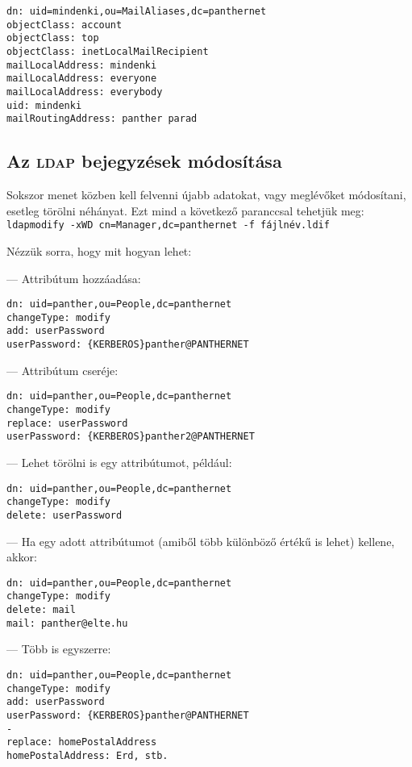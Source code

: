 \begin{Verbatim}[frame=single]
dn: uid=mindenki,ou=MailAliases,dc=panthernet
objectClass: account
objectClass: top
objectClass: inetLocalMailRecipient
mailLocalAddress: mindenki
mailLocalAddress: everyone
mailLocalAddress: everybody
uid: mindenki
mailRoutingAddress: panther parad
\end{Verbatim}


\subsection{Az \textsc{ldap} bejegyzések módosítása}

Sokszor menet közben kell felvenni újabb adatokat, vagy meglévőket módosítani, esetleg törölni néhányat. Ezt mind a
következő paranccsal tehetjük meg:\\
\texttt{ldapmodify -xWD cn=Manager,dc=panthernet -f fájlnév.ldif}

Nézzük sorra, hogy mit hogyan lehet:

\noindent  --- Attribútum hozzáadása:

\begin{Verbatim}[frame=single]
dn: uid=panther,ou=People,dc=panthernet
changeType: modify
add: userPassword
userPassword: {KERBEROS}panther@PANTHERNET
\end{Verbatim}

\noindent --- Attribútum cseréje:
\begin{Verbatim}[frame=single]
dn: uid=panther,ou=People,dc=panthernet
changeType: modify
replace: userPassword
userPassword: {KERBEROS}panther2@PANTHERNET
\end{Verbatim}

\noindent --- Lehet törölni is egy attribútumot, például:

\begin{Verbatim}[frame=single]
dn: uid=panther,ou=People,dc=panthernet
changeType: modify
delete: userPassword
\end{Verbatim}


\noindent --- Ha egy adott attribútumot (amiből több különböző értékű is lehet) kellene, akkor:

\begin{Verbatim}[frame=single]
dn: uid=panther,ou=People,dc=panthernet
changeType: modify
delete: mail
mail: panther@elte.hu
\end{Verbatim}

\noindent --- Több is egyszerre:

\begin{Verbatim}[frame=single]
dn: uid=panther,ou=People,dc=panthernet
changeType: modify
add: userPassword
userPassword: {KERBEROS}panther@PANTHERNET
-
replace: homePostalAddress
homePostalAddress: Erd, stb.
\end{Verbatim}

